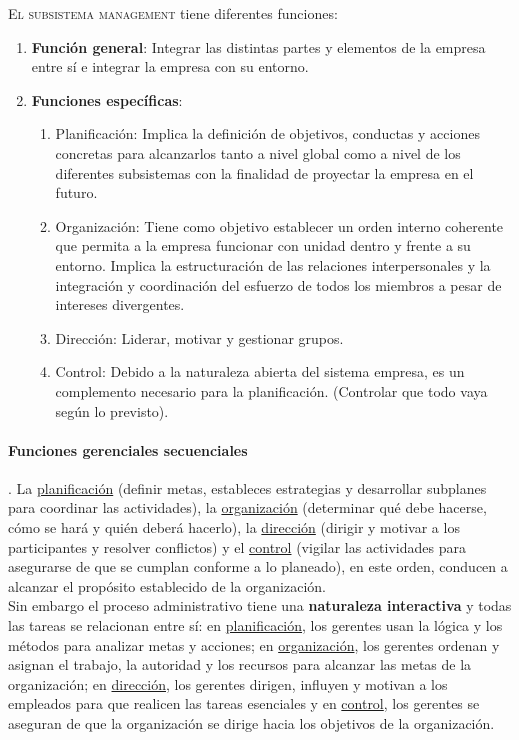 \documentclass[12pt]{article}
\theoremstyle{definition_wo_parentheses}
\begin{document}
\textsc{El subsistema management} tiene diferentes funciones:
\begin{enumerate}
\item \textbf{Función general}: Integrar las distintas partes y elementos de la empresa entre sí e integrar la empresa con su entorno.
\item \textbf{Funciones específicas}:
\begin{enumerate}
\item Planificación: Implica la definición de objetivos, conductas y acciones concretas para alcanzarlos tanto a nivel global como a nivel de los diferentes subsistemas con la finalidad de proyectar la empresa en el futuro.
\item Organización: Tiene como objetivo establecer un orden interno coherente que permita a la empresa funcionar con unidad dentro y frente a su entorno. Implica la estructuración de las relaciones interpersonales y la integración y coordinación del esfuerzo de todos los miembros a pesar de intereses divergentes.
\item Dirección: Liderar, motivar y gestionar grupos.
\item Control: Debido a la naturaleza abierta del sistema empresa, es un complemento necesario para la planificación. (Controlar que todo vaya según lo previsto).
\end{enumerate}
\end{enumerate}

\paragraph{Funciones gerenciales secuenciales}.
La \underline{planificación} (definir metas, estableces estrategias y desarrollar subplanes para coordinar las actividades), la \underline{organización} (determinar qué debe hacerse, cómo se hará y quién deberá hacerlo), la \underline{dirección} (dirigir y motivar a los participantes y resolver conflictos) y el \underline{control} (vigilar las actividades para asegurarse de que se cumplan conforme a lo planeado), en este orden, conducen a alcanzar el propósito establecido de la organización.\\

Sin embargo el proceso administrativo tiene una \textbf{naturaleza interactiva} y todas las tareas se relacionan entre sí: en \underline{planificación}, los gerentes usan la lógica y los métodos para analizar metas y acciones; en \underline{organización}, los gerentes ordenan y asignan el trabajo, la autoridad y los recursos para alcanzar las metas de la organización; en \underline{dirección}, los gerentes dirigen, influyen y motivan a los empleados para que realicen las tareas esenciales y en \underline{control}, los gerentes se aseguran de que la organización se dirige hacia los objetivos de la organización.
\end{document}

